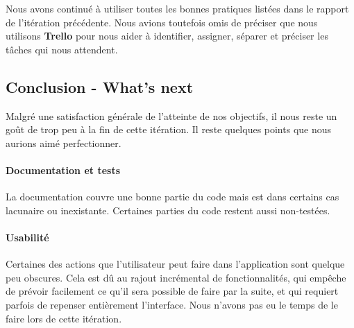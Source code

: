 Nous avons continué à utiliser toutes les bonnes pratiques listées dans le
rapport de l'itération précédente. Nous avions toutefois omis de préciser que
nous utilisons \textbf{Trello} pour nous aider à identifier, assigner, séparer 
et préciser les tâches qui nous attendent. 

\subsection{Conclusion - What's next}
Malgré une satisfaction générale de l'atteinte de nos objectifs, il nous reste 
un goût de trop peu à la fin de cette itération. Il reste quelques points que 
nous aurions aimé perfectionner.

	\paragraph{Documentation et tests} 
	La documentation couvre une bonne partie du code mais est dans certains cas 
	lacunaire ou inexistante. Certaines parties du code restent aussi non-testées.

	\paragraph{Usabilité} 
	Certaines des actions que l'utilisateur peut faire dans l'application sont
	quelque peu obscures. Cela est dû au rajout incrémental de fonctionnalités, 
	qui empêche de prévoir facilement ce qu'il sera possible de faire par la suite, 
	et qui requiert parfois de repenser entièrement l'interface. Nous n'avons
	pas eu le temps de le faire lors de cette itération.
